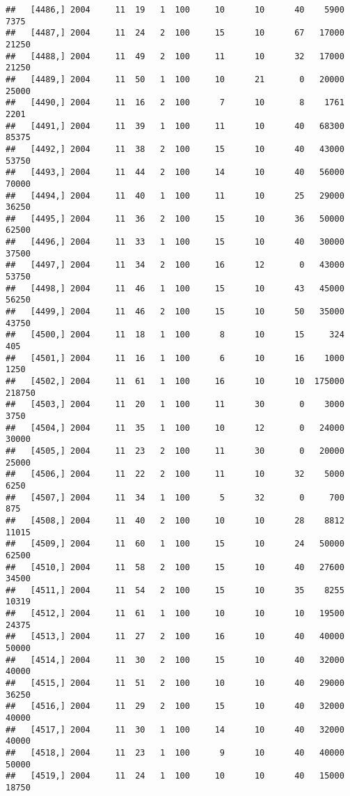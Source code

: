 \documentclass{article}\usepackage[]{graphicx}\usepackage[]{color}
\makeatletter
\newenvironment{kframe}{%
 \def\at@end@of@kframe{}%
 \ifinner\ifhmode%
  \def\at@end@of@kframe{\end{minipage}}%
  \begin{minipage}{\columnwidth}%
 \fi\fi%
 \def\FrameCommand##1{\hskip\@totalleftmargin \hskip-\fboxsep
 \colorbox{shadecolor}{##1}\hskip-\fboxsep
     \hskip-\linewidth \hskip-\@totalleftmargin \hskip\columnwidth}%
 \MakeFramed {\advance\hsize-\width
   \@totalleftmargin\z@ \linewidth\hsize
   \@setminipage}}%
 {\par\unskip\endMakeFramed%
 \at@end@of@kframe}
\newenvironment{knitrout}{}{} %
\makeatother
\begin{document}
\begin{knitrout}
\begin{kframe}
\begin{verbatim}
##   [4486,] 2004     11  19   1  100     10      10      40    5900    7375
##   [4487,] 2004     11  24   2  100     15      10      67   17000   21250
##   [4488,] 2004     11  49   2  100     11      10      32   17000   21250
##   [4489,] 2004     11  50   1  100     10      21       0   20000   25000
##   [4490,] 2004     11  16   2  100      7      10       8    1761    2201
##   [4491,] 2004     11  39   1  100     11      10      40   68300   85375
##   [4492,] 2004     11  38   2  100     15      10      40   43000   53750
##   [4493,] 2004     11  44   2  100     14      10      40   56000   70000
##   [4494,] 2004     11  40   1  100     11      10      25   29000   36250
##   [4495,] 2004     11  36   2  100     15      10      36   50000   62500
##   [4496,] 2004     11  33   1  100     15      10      40   30000   37500
##   [4497,] 2004     11  34   2  100     16      12       0   43000   53750
##   [4498,] 2004     11  46   1  100     15      10      43   45000   56250
##   [4499,] 2004     11  46   2  100     15      10      50   35000   43750
##   [4500,] 2004     11  18   1  100      8      10      15     324     405
##   [4501,] 2004     11  16   1  100      6      10      16    1000    1250
##   [4502,] 2004     11  61   1  100     16      10      10  175000  218750
##   [4503,] 2004     11  20   1  100     11      30       0    3000    3750
##   [4504,] 2004     11  35   1  100     10      12       0   24000   30000
##   [4505,] 2004     11  23   2  100     11      30       0   20000   25000
##   [4506,] 2004     11  22   2  100     11      10      32    5000    6250
##   [4507,] 2004     11  34   1  100      5      32       0     700     875
##   [4508,] 2004     11  40   2  100     10      10      28    8812   11015
##   [4509,] 2004     11  60   1  100     15      10      24   50000   62500
##   [4510,] 2004     11  58   2  100     15      10      40   27600   34500
##   [4511,] 2004     11  54   2  100     15      10      35    8255   10319
##   [4512,] 2004     11  61   1  100     10      10      10   19500   24375
##   [4513,] 2004     11  27   2  100     16      10      40   40000   50000
##   [4514,] 2004     11  30   2  100     15      10      40   32000   40000
##   [4515,] 2004     11  51   2  100     10      10      40   29000   36250
##   [4516,] 2004     11  29   2  100     15      10      40   32000   40000
##   [4517,] 2004     11  30   1  100     14      10      40   32000   40000
##   [4518,] 2004     11  23   1  100      9      10      40   40000   50000
##   [4519,] 2004     11  24   1  100     10      10      40   15000   18750

\end{verbatim}
\end{kframe}
\end{knitrout}
\end{document}
